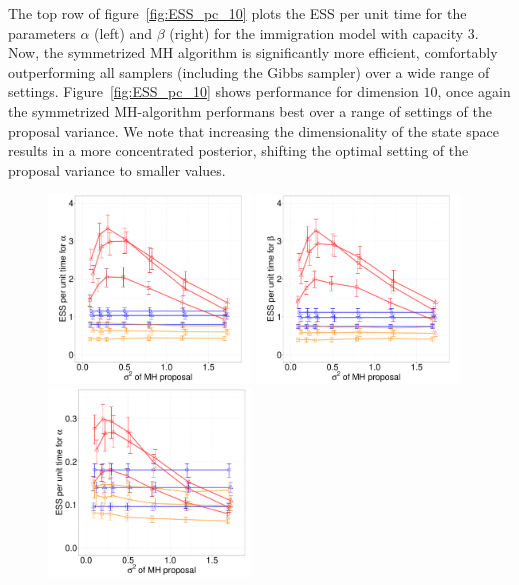 { The top row of figure~\ref{fig:ESS_pc_10} plots the ESS per unit time for the 
 parameters $\alpha$ (left) and $\beta$ (right) for the immigration model with 
 capacity $3$.  Now, the symmetrized MH algorithm is significantly 
 more efficient, comfortably outperforming all samplers (including the Gibbs 
 sampler) over a wide range of settings. %
 Figure~\ref{fig:ESS_pc_10} shows performance for dimension
 $10$, once again the symmetrized MH-algorithm performans best over a 
 range of settings of the proposal variance. We note that increasing the
 dimensionality of the state space results in a more concentrated posterior,
 shifting the optimal setting of the proposal variance to smaller values.
  \begin{figure}%
  \centering
  \begin{minipage}[!hp]{0.8\linewidth}
  \centering
    \includegraphics [width=0.48\textwidth, angle=0]{figures_new_apr12/CQ_alpha_dim3_18apr12.pdf}
    \includegraphics [width=0.48\textwidth, angle=0]{figures_new_apr12/CQ_beta_dim3_18apr12.pdf}
  \centering
    \includegraphics [width=0.480\textwidth, angle=0]{figures_new_apr12/CQ_alpha_dim10_18apr12.pdf}

\end{minipage}
\end{figure}}
